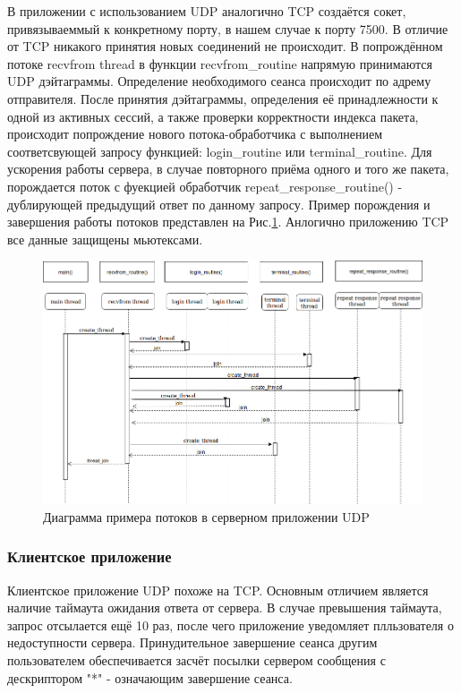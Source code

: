 В приложении с использованием UDP аналогично TCP создаётся сокет, привязываеммый к конкретному порту, в нашем случае к порту 7500. В отличие от TCP никакого принятия новых соединений не происходит. В попрождённом потоке recvfrom thread в функции recvfrom_routine напрямую принимаются UDP дэйтаграммы. Определение необходимого сеанса происходит по адрему отправителя. После принятия дэйтаграммы, определения её принадлежности к одной из активных сессий, а также проверки корректности индекса пакета, происходит попрождение нового потока-обработчика с выполнением соответсвующей запросу функцией: login_routine или terminal_routine. Для ускорения работы сервера, в случае повторного приёма одного и того же пакета, порождается поток с фуекцией обработчик repeat_response_routine() - дублирующей предыдущий ответ по данному запросу. Пример порождения и завершения работы потоков представлен на Рис.\ref{udp_thr}. Анлогично приложению TCP все данные защищены мьютексами.

\begin{figure}[H]
\centering
\includegraphics[width=1\textwidth]{pics/udpthread.png}
\caption{Диаграмма примера потоков в серверном приложении UDP}
\label{udp_thr}
\end{figure}
\subsubsection{Клиентское приложение}
Клиентское приложение UDP похоже на TCP. Основным отличием является наличие таймаута ожидания ответа от сервера. В случае превышения таймаута, запрос отсылается ещё 10 раз, после чего приложение уведомляет плльзователя о недоступности сервера. Принудительное завершение сеанса другим пользователем обеспечивается засчёт посылки сервером сообщения с дескриптором "*" - означающим завершение сеанса.

